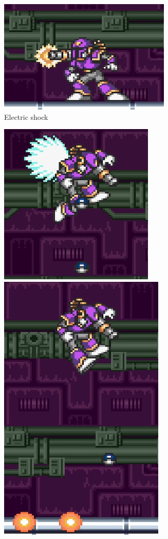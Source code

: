 \begin{figure}[htp]
	\centering
	\begin{subfigure}[t]{0.4\linewidth}
		\centering
		\includegraphics[width=\linewidth]{figures/X1/Sigma_stages/Vile_cannon_1.jpg}
		\caption{Electric shock}
	\end{subfigure}
	\begin{subfigure}[t]{0.5\linewidth}
		\centering
		\includegraphics[width=0.5\linewidth]{figures/X1/Sigma_stages/Vile_bomb_1.jpg}
		\includegraphics[width=0.35\linewidth]{figures/X1/Sigma_stages/Vile_bomb_2.jpg}

\end{subfigure}
\end{figure}
